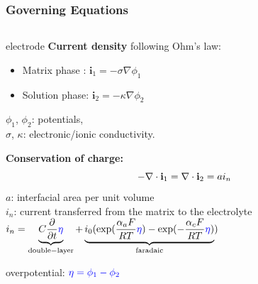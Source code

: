 \documentclass[10pt,xcolor=dvipsnames,compress]{beamer}
\begin{document}
\begin{frame}
\frametitle{Governing Equations}
\vfill

\begin{columns}
\begin{column}{.65\textwidth}
\begin{block}{electrode}
\textbf{Current density} following Ohm's law:
\begin{itemize}
\item Matrix phase :
$
\mathbf{i}_1 = -\sigma\nabla\phi_1
$
\item Solution phase:
$
\mathbf{i}_2 = -\kappa\nabla\phi_2
$
\end{itemize}
$\phi_1$, $\phi_2$: potentials,\\
$\sigma$, $\kappa$: electronic/ionic conductivity.
%

\vspace{0.1in}
\textbf{Conservation of charge:}
\vspace{-0.1in}
\begin{equation*}
-\nabla \cdot \mathbf{i}_1 =  \nabla\cdot \mathbf{i}_2 = a {i}_n
\vspace{-0.1in}
\end{equation*}
$a$: interfacial area per unit volume \\
${i}_n$: current transferred from the matrix to the electrolyte\\
$
{i}_n = \underbrace{C \frac{\partial}{\partial t} {\color{blue} \eta}}_{\rm double-layer} +
\underbrace{{i}_0 ( \exp (\frac{\alpha_aF}{RT} {\color{blue} \eta}) - \exp (-\frac{\alpha_cF}{RT}{\color{blue} \eta})}_{\rm faradaic})
$

\vspace{0.07in}
\begin{center}
overpotential: 
$
{\color{blue} \eta =  \phi_1 - \phi_2}
$
\end{center}


\end{block}
\end{column}
\end{columns}
\end{frame}
\end{document}
